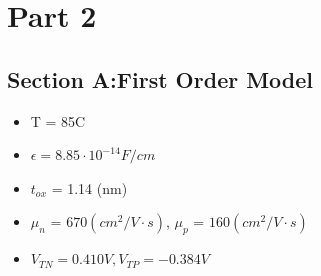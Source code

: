 \documentclass{article}
\begin{document}
\section*{Part 2}
\subsection*{Section A:First Order Model}
\begin{itemize}
    \item T = 85C
    \item $\epsilon = 8.85\cdot10^{-14} F/cm$
    \item $t_{ox}$ = 1.14 (nm)
    \item $\mu_n$ = $670 (cm^2/V \cdot s)$, $\mu_p$ = $160 (cm^2/V \cdot s)$
    \item $V_{TN} = 0.410V,V_{TP} = -0.384V$
\end{itemize}
\end{document}
